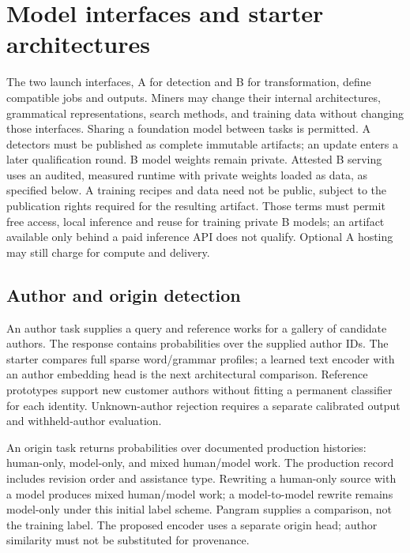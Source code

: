 \section{Model interfaces and starter
architectures}\label{model-interfaces-and-starter-architectures}

The two launch interfaces, A for detection and B for transformation,
define compatible jobs and outputs. Miners may
change their internal architectures, grammatical representations, search
methods, and training data without changing those interfaces. Sharing a
foundation model between tasks is permitted. A detectors must be published
as complete immutable artifacts; an update enters a later qualification
round. B model weights remain private. Attested B serving uses an audited,
measured runtime with private weights loaded as data, as specified below.
A training recipes and data need not be public, subject to the publication
rights required for the resulting artifact.
Those terms must permit free access, local inference and reuse for
training private B models; an artifact available only behind a paid
inference API does not qualify. Optional A hosting may still charge for
compute and delivery.

\subsection{Author and origin
detection}\label{author-and-origin-detection}

An author task supplies a query and reference works for a gallery of
candidate authors. The response contains probabilities over the supplied
author IDs. The starter compares full sparse word/grammar profiles; a
learned text encoder with an author embedding head is the next
architectural comparison. Reference prototypes support new customer
authors without fitting a permanent classifier for each identity.
Unknown-author rejection requires a separate calibrated output and
withheld-author evaluation.

An origin task returns probabilities over documented production
histories: human-only, model-only, and mixed human/model work. The
production record includes revision order and assistance type. Rewriting
a human-only source with a model produces mixed human/model work; a model-to-model
rewrite remains model-only under this initial label
scheme. Pangram supplies a comparison, not the training label. The
proposed encoder uses a separate origin head; author similarity must not
be substituted for provenance.

